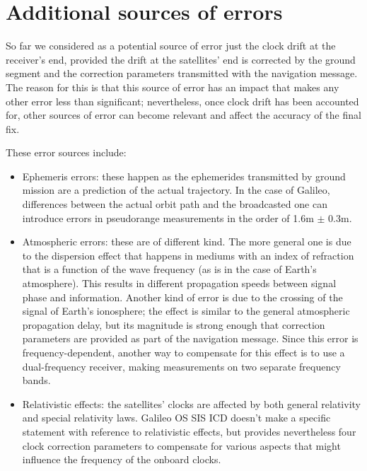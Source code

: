 \section{Additional sources of errors}
So far we considered as a potential source of error just the clock drift at the
receiver's end, provided the drift at the satellites' end is corrected by the
ground segment and the correction parameters transmitted with the navigation
message. The reason for this is that this source of error has an impact that
makes any other error less than significant; nevertheless, once clock drift has
been accounted for, other sources of error can become relevant and affect the
accuracy of the final fix.

These error sources include:
\begin{itemize}
  \item Ephemeris errors: these happen as the ephemerides transmitted by ground
    mission are a prediction of the actual trajectory. In the case of Galileo,
    differences between the actual orbit path and the broadcasted one can
    introduce errors in pseudorange measurements in the order of 1.6m $\pm$
    0.3m.
  \item Atmospheric errors: these are of different kind. The more general one is
    due to the dispersion effect that happens in mediums with an index of
    refraction that is a function of the wave frequency (as is in the case of
    Earth's atmosphere). This results in different propagation speeds between
    signal phase and information. Another kind of error is due to the crossing
    of the signal of Earth's ionosphere; the effect is similar to the general
    atmospheric propagation delay, but its magnitude is strong enough that
    correction parameters are provided as part of the navigation message.
    Since this error is frequency-dependent, another way to compensate for this
    effect is to use a dual-frequency receiver, making measurements on two
    separate frequency bands.
  \item Relativistic effects: the satellites' clocks are affected by both
    general relativity and special relativity laws. Galileo OS SIS ICD doesn't
    make a specific statement with reference to relativistic effects, but
    provides nevertheless four clock correction parameters to compensate for
    various aspects that might influence the frequency of the onboard clocks.
\end{itemize}

